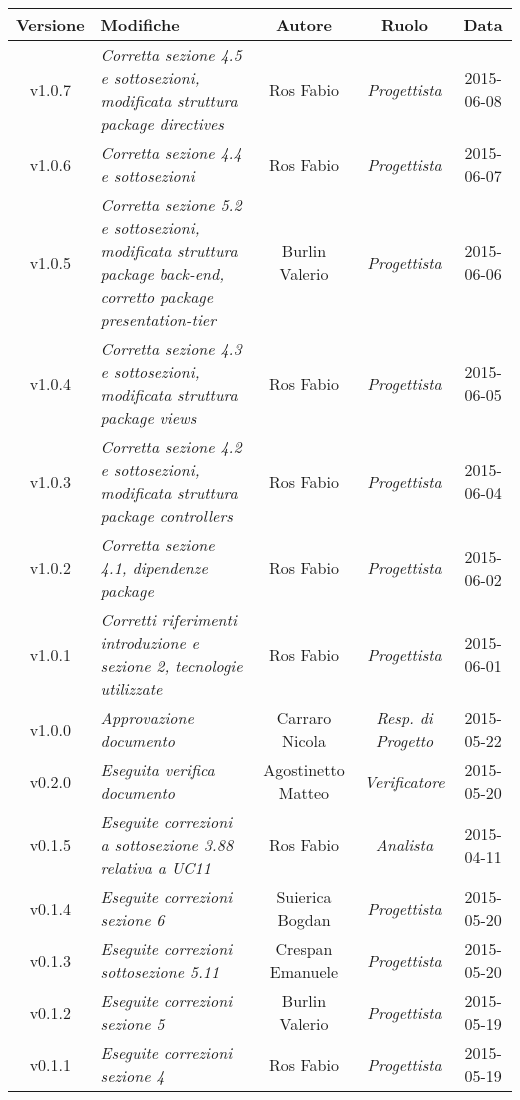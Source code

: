 \newpage

\begin{table}[h]
\centering
\begin{tabular}{|c|p{}|c|c|c|}
	\toprule
	\textbf{Versione} & \textbf{Modifiche} & \textbf{Autore} & \textbf{Ruolo} & \textbf{Data} \\
	\midrule
	\midrule
		v1.0.7 & \textit{Corretta sezione 4.5 e sottosezioni, modificata struttura package directives} & Ros Fabio & \textit{Progettista} & 2015-06-08\\
	\midrule
		v1.0.6 & \textit{Corretta sezione 4.4 e sottosezioni} & Ros Fabio & \textit{Progettista} & 2015-06-07\\
	\midrule
		v1.0.5 & \textit{Corretta sezione 5.2 e sottosezioni, modificata struttura package back-end, corretto package presentation-tier} & Burlin Valerio & \textit{Progettista} & 2015-06-06\\
	\midrule
		v1.0.4 & \textit{Corretta sezione 4.3 e sottosezioni, modificata struttura package views} & Ros Fabio & \textit{Progettista} & 2015-06-05\\
	\midrule
	v1.0.3 & \textit{Corretta sezione 4.2 e sottosezioni, modificata struttura package controllers} & Ros Fabio & \textit{Progettista} & 2015-06-04\\
	\midrule
	v1.0.2 & \textit{Corretta sezione 4.1, dipendenze package} & Ros Fabio & \textit{Progettista} & 2015-06-02\\
	\midrule
		v1.0.1 & \textit{Corretti riferimenti introduzione e sezione 2, tecnologie utilizzate} & Ros Fabio & \textit{Progettista} & 2015-06-01\\
	\midrule
		v1.0.0 & \textit{Approvazione documento} & Carraro Nicola & \textit{Resp. di Progetto} & 2015-05-22\\
	\midrule
		v0.2.0 & \textit{Eseguita verifica documento} & Agostinetto Matteo & \textit{Verificatore} & 2015-05-20\\
	\midrule
		v0.1.5 & \textit{Eseguite correzioni a sottosezione 3.88 relativa a UC11} & Ros Fabio & \textit{Analista} & 2015-04-11\\
	\midrule
		v0.1.4 & \textit{Eseguite correzioni sezione 6} & Suierica Bogdan & \textit{Progettista} & 2015-05-20\\
	\midrule
		v0.1.3 & \textit{Eseguite correzioni sottosezione 5.11} & Crespan Emanuele & \textit{Progettista} & 2015-05-20\\
	\midrule
		v0.1.2 & \textit{Eseguite correzioni sezione 5} & Burlin Valerio & \textit{Progettista} & 2015-05-19\\
	\midrule
		v0.1.1 & \textit{Eseguite correzioni sezione 4} & Ros Fabio & \textit{Progettista} & 2015-05-19\\
	\bottomrule
\end{tabular}
\end{table}

